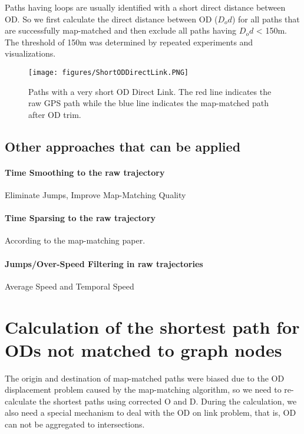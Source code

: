\documentclass{article}
\begin{document}
Paths having loops are usually identified with a short direct distance between OD. So we first calculate the direct distance between OD ($D_od$) for all paths that are successfully map-matched and then exclude all paths having $D_od$ < 150m. The threshold of 150m was determined by repeated experiments and visualizations.   


\begin{figure}
  \centering
  \texttt{[image: figures/ShortODDirectLink.PNG]}
  \caption{Paths with a very short OD Direct Link. The red line indicates the raw GPS path while the blue line indicates the map-matched path after OD trim.}
  \label{fig:fig1}
\end{figure}






\subsection{Other approaches that can be applied}

\paragraph{Time Smoothing to the raw trajectory}
Eliminate Jumps, Improve Map-Matching Quality

\paragraph{Time Sparsing to the raw trajectory}
According to the map-matching paper. 

\paragraph{Jumps/Over-Speed Filtering in raw trajectories}
Average Speed and Temporal Speed 




\section{Calculation of the shortest path for ODs not matched to graph nodes}
The origin and destination of map-matched paths were biased due to the OD displacement problem caused by the map-matching algorithm, so we need to re-calculate the shortest paths using corrected O and D. During the calculation, we also need a special mechanism to deal with the OD on link problem, that is, OD can not be aggregated to intersections. 
\end{document}
